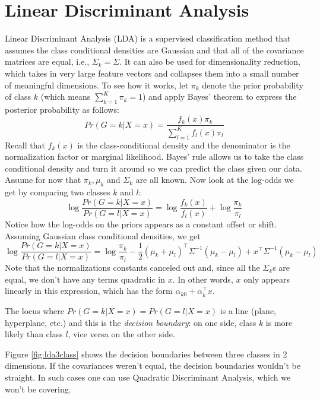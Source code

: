 \documentclass[a4paper]{article}
\begin{document}
\section{Linear Discriminant Analysis}
Linear Discriminant Analysis (LDA) is a supervised classification method that assumes the class conditional densities are Gaussian and that all of the covariance matrices are equal, i.e., $\Sigma_k=\Sigma$.  It can also be used for dimensionality reduction, which takes in very large feature vectors and collapses them into a small number of meaningful dimensions.  To see how it works, let $\pi_k$ denote the prior probability of class $k$ (which means $\sum_{k=1}^K \pi_k=1$) and apply Bayes' theorem to express the posterior probability as follows:
$$
Pr(G=k|X=x) = \frac{f_k(x)\pi_k}{\sum_{l=1}^K f_l(x)\pi_l}
$$
Recall that $f_k(x)$ is the class-conditional density and the denominator is the normalization factor or marginal likelihood.  Bayes' rule allows us to take the class conditional density and turn it around so we can predict the class given our data.
Assume for now that $\pi_k, \mu_k$ and $\Sigma_k$ are all known.  Now look at the log-odds we get by comparing two classes $k$ and $l$:
$$
\log \frac{Pr(G=k|X=x)}{Pr(G=l|X=x)}=\log\frac{f_k(x)}{f_l(x)}+\log\frac{\pi_k}{\pi_l}
$$
Notice how the log-odds on the priors appears as a constant offset or shift.
Assuming Gaussian class conditional densities, we get
$$
\log \frac{Pr(G=k|X=x)}{Pr(G=l|X=x)}=\log\frac{\pi_k}{\pi_l}-\frac{1}{2}(\mu_k+\mu_l)^\top\Sigma^{-1}(\mu_k-\mu_l)+x^\top\Sigma^{-1}(\mu_k-\mu_l)
$$
Note that the normalizations constants canceled out and, since all the $\Sigma_k$s are equal, we don't have any terms quadratic in $x$.  In other words, $x$ only appears linearly in this expression, which has the form $\alpha_{k0}+\alpha_k^\top x$.

The locus where $Pr(G=k|X=x) = Pr(G=l|X=x)$ is a line (plane, hyperplane, etc.) and this is the \emph{decision boundary}: on one side, class $k$ is more likely than class $l$, vice versa on the other side.

Figure \ref{fig:lda3class} shows the decision boundaries between three classes in 2 dimensions.  If the covariances weren't equal, the decision boundaries wouldn't be straight.  In such cases one can use Quadratic Discriminant Analysis, which we won't be covering.
\end{document}

